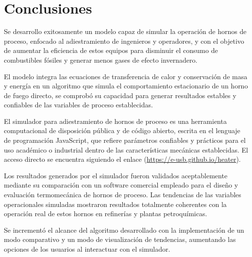 \chapter*{Conclusiones}

    \par Se desarrollo exitosamente un modelo capaz de simular la operación de hornos de proceso, enfocado al adiestramiento de ingenieros y operadores, y con el objetivo de aumentar la eficiencia de estos equipos para disminuir el consumo de combustibles fósiles y generar menos gases de efecto invernadero.

    \par El modelo integra las ecuaciones de transferencia de calor y conservación de masa y energía en un algoritmo que simula el comportamiento estacionario de un horno de fuego directo, se comprobó su capacidad para generar resultados estables y confiables de las variables de proceso establecidas.
    
    \par El simulador para adiestramiento de hornos de proceso es una herramienta computacional de disposición pública y de código abierto, escrita en el lenguaje de programación JavaScript, que refiere parámetros confiables y prácticos para el uso académico o industrial dentro de las características mecánicas establecidas. El acceso directo se encuentra siguiendo el enlace (\url{https://e-usb.github.io/heater}).
    
    \par Los resultados generados por el simulador fueron validados aceptablemente mediante su comparación con un software comercial empleado para el diseño y evaluación termomecánica de hornos de proceso. Las tendencias de las variables operacionales simuladas mostraron resultados totalmente coherentes con la operación real de estos hornos en refinerías y plantas petroquímicas.

    \par Se incrementó el alcance del algoritmo desarrollado con la implementación de un modo comparativo y un modo de visualización de tendencias, aumentando las opciones de los usuarios al interactuar con el simulador.
